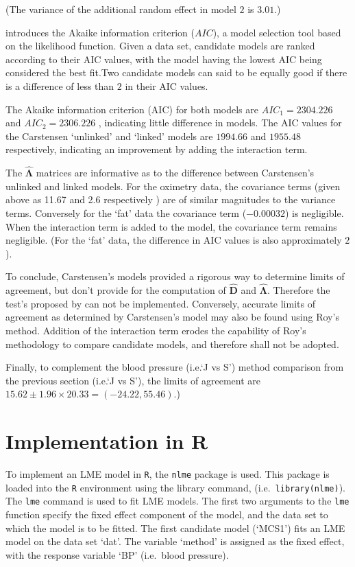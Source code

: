 \documentclass[12pt, a4paper]{report}
\theoremstyle{plain}
\theoremstyle{definition}
\theoremstyle{remark}
\begin{document}
\noindent (The variance of the additional random effect in model $2$ is $3.01$.)

\citet{akaike} introduces the Akaike information criterion ($AIC$), a model 
selection tool based on the likelihood function. Given a data set, candidate models
are ranked according to their AIC values, with the model having the lowest AIC being considered the best fit.Two candidate models can said to be equally good if there is a difference of less than $2$ in their AIC values.

The Akaike information criterion (AIC) for both models are $AIC_{1} = 2304.226$ and $AIC_{2} = 2306.226$ , indicating little difference in models. The AIC values for the Carstensen `unlinked' and `linked' models are $1994.66$ and $1955.48$ respectively, indicating an improvement by adding the interaction term.

The $\boldsymbol{\hat{\Lambda}}$ matrices are informative as to the difference between Carstensen's unlinked and linked models. For the oximetry data, the covariance terms (given above as 11.67 and 2.6 respectively ) are of similar magnitudes to the variance terms. Conversely for the `fat' data the covariance term ($-0.00032$) is negligible. When the interaction term is added to the model, the covariance term remains negligible. (For the `fat' data, the difference in AIC values is also approximately $2$).

To conclude, Carstensen's models provided a rigorous way to determine limits of agreement, but don't provide for the computation of $\boldsymbol{\hat{D}}$ and $\boldsymbol{\hat{\Lambda}}$. Therefore the test's proposed by \citet{roy} can not be implemented. Conversely, accurate limits of agreement as determined by Carstensen's model may also be found using Roy's method. Addition of the interaction term erodes the capability of Roy's methodology to compare candidate models, and therefore shall not be adopted.

Finally, to complement the blood pressure (i.e.`J vs S') method comparison from the previous section (i.e.`J vs S'), the limits of agreement are $15.62 \pm 1.96 \times 20.33 = (-24.22, 55.46)$.)
\newpage
\section{Implementation in R}
To implement an LME model in \texttt{R}, the \texttt{nlme} package is used. This package is loaded into the \texttt{R} environment using the library command, (i.e.\ \texttt{library(nlme)}). The \texttt{lme} command is used to fit LME models. The first two arguments to the \texttt{lme} function specify the fixed effect component of the model, and the data set to which the model is to be fitted. The first candidate model (`MCS1') fits an LME model on the data set `dat'. The variable `method' is assigned as the fixed effect, with the response variable `BP' (i.e.\ blood pressure).
\end{document}

